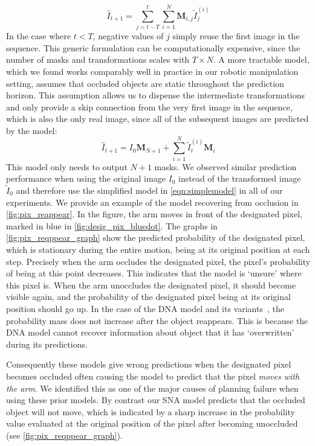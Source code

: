 \begin{equation}
\hat{I}_{t+1} =  \sum_{j=t-T}^{t} \sum_{i=1}^{N} \mathbf{M}_{i,j} \tilde{I}_{j}^{(i)}
\label{eqn:general_model}
\end{equation}
In the case where $t < T$, negative values of $j$ simply reuse the first image in the sequence. This generic formulation can be computationally expensive, since the number of masks and transformations scales with $T \times N$. A more tractable model, which we found works comparably well in practice in our robotic manipulation setting, assumes that occluded objects are static throughout the prediction horizon. This assumption allows us to dispense the intermediate transformations and only provide a skip connection from the very first image in the sequence, which is also the only real image, since all of the subsequent images are predicted by the model:
\begin{equation}
\hat{I}_{t+1} =  I_0 \mathbf{M}_{N+1} +  \sum_{i=1}^{N} \tilde{I}_t^{(i)} \mathbf{M}_i
\label{eqn:simplemodel}
\end{equation}
This model only needs to output $N+1$ masks. We observed similar prediction performance when using the original image $I_0$ instead of the transformed image $\tilde{I}_0$ and therefore use the simplified model in \autoref{eqn:simplemodel} in all of our experiments. We provide an example of the model recovering from occlusion in \autoref{fig:pix_reappear}. In the figure, the arm moves in front of the designated pixel, marked in blue in \autoref{fig:desig_pix_bluedot}. The graphs in \autoref{fig:pix_reqppear_graph} show the predicted probability of the designated pixel, which is stationary during the entire motion, being at its original position at each step. Precisely when the arm occludes the designated pixel, the pixel's probability of being at this point decreases. This indicates that the model is `unsure' where this pixel is. When the arm unoccludes the designated pixel, it should become visible again, and the probability of the designated pixel being at its original position should go up. In the case of the DNA model and its variants~\cite{finn_nips}, the probability mass does not increase after the object reappears. This is because the DNA model cannot recover information about object that it has `overwritten' during its predictions.



Consequently these models give wrong predictions when the designated pixel becomes occluded often causing the model to predict that the pixel \emph{moves with the arm}. We identified this as one of the major causes of planning failure when using these prior models. By contrast our SNA model predicts that the occluded object will not move, which is indicated by a sharp increase in the probability value evaluated at the original position of the pixel after becoming unoccluded (see \autoref{fig:pix_reqppear_graph}).

